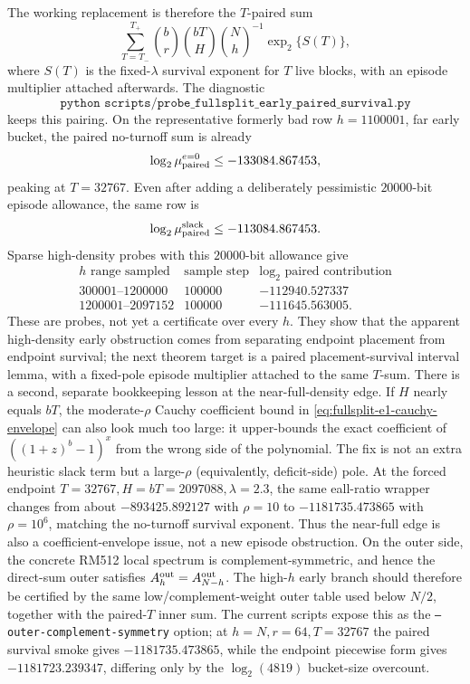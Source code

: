 The working replacement is therefore the \(T\)-paired sum
\[
\sum_{T=T_-}^{T_+}
\binom{b}{r}\binom{bT}{H}\binom{N}{h}^{-1}
\exp_2\{S(T)\},
\]
where \(S(T)\) is the fixed-\(\lambda\) survival exponent for \(T\) live blocks, with an episode multiplier attached
afterwards.  The diagnostic
\[
\texttt{python scripts/probe\_fullsplit\_early\_paired\_survival.py}
\]
keeps this pairing.  On the representative formerly bad row \(h=1100001\), far early bucket, the paired no-turnoff
sum is already
\[
\log_2 \mu_{\rm paired}^{e=0}\le -133084.867453,
\]
peaking at \(T=32767\).  Even after adding a deliberately pessimistic \(20000\)-bit episode allowance, the same row is
\[
\log_2 \mu_{\rm paired}^{\rm slack}\le -113084.867453.
\]
Sparse high-density probes with this \(20000\)-bit allowance give
\[
\begin{array}{c|c|c}
h\text{ range sampled} & \text{sample step} & \log_2\text{ paired contribution}\\
\hline
300001\text{--}1200000 & 100000 & -112940.527337\\
1200001\text{--}2097152 & 100000 & -111645.563005 .
\end{array}
\]
These are probes, not yet a certificate over every \(h\).  They show that the apparent high-density early obstruction
comes from separating endpoint placement from endpoint survival; the next theorem target is a paired
placement-survival interval lemma, with a fixed-pole episode multiplier attached to the same \(T\)-sum.
There is a second, separate bookkeeping lesson at the near-full-density edge.  If \(H\) nearly equals \(bT\), the
moderate-\(\rho\) Cauchy coefficient bound in \eqref{eq:fullsplit-e1-cauchy-envelope} can also look much too large:
it upper-bounds the exact coefficient of \(((1+z)^b-1)^x\) from the wrong side of the polynomial.  The fix is not an
extra heuristic slack term but a large-\(\rho\) (equivalently, deficit-side) pole.  At the forced endpoint
\(T=32767,H=bT=2097088,\lambda=2.3\), the same eall-ratio wrapper changes from about
\(-893425.892127\) with \(\rho=10\) to \(-1181735.473865\) with \(\rho=10^6\), matching the no-turnoff survival
exponent.  Thus the near-full edge is also a coefficient-envelope issue, not a new episode obstruction.
On the outer side, the concrete RM512 local spectrum is complement-symmetric, and hence the direct-sum outer satisfies
\(A_h^{\rm out}=A_{N-h}^{\rm out}\).  The high-\(h\) early branch should therefore be certified by the same
low/complement-weight outer table used below \(N/2\), together with the paired-\(T\) inner sum.  The current scripts
expose this as the \texttt{--outer-complement-symmetry} option; at \(h=N,r=64,T=32767\) the paired survival smoke gives
\(-1181735.473865\), while the endpoint piecewise form gives \(-1181723.239347\), differing only by the
\(\log_2(4819)\) bucket-size overcount.

